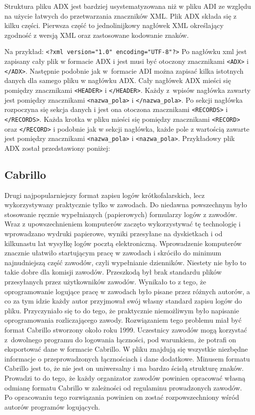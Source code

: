 \documentclass[]{mgr}
\begin{document}
            Struktura pliku ADX jest bardziej usystematyzowana niż w pliku ADI ze względu na użycie łatwych do przetwarzania znaczników XML. Plik ADX składa się z kilku części. Pierwsza część to jednolinijkowy nagłówek XML określający zgodność z wersją XML oraz zastosowane kodowanie znaków.

            \noindent Na przykład: \texttt{<?xml version="1.0" encoding="UTF-8"?>}
            Po nagłówku xml jest zapisany cały plik w formacie ADX i jest musi być otoczony znacznikami \texttt{<ADX>} i \texttt{</ADX>}. Następnie podobnie jak w~formacie ADI można zapisać kilka istotnych danych dla samego pliku w nagłówku ADX. Cały nagłówek ADX mieści się pomiędzy znacznikami \texttt{<HEADER>} i \texttt{</HEADER>}. Każdy z~wpisów nagłówka zawarty jest pomiędzy znacznikami \texttt{<nazwa\_pola>} i \texttt{</nazwa\_pola>}. Po sekcji nagłówka rozpoczyna się sekcja danych i jest ona otoczona znacznikami \texttt{<RECORDS>} i \texttt{</RECORDS>}. Każda krotka w pliku mieści się pomiędzy znacznikami \texttt{<RECORD>} oraz \texttt{</RECORD>} i podobnie jak w sekcji nagłówka, każde pole z wartością zawarte jest pomiędzy znacznikami \texttt{<nazwa\_pola>} i \texttt{<nazwa\_pola>}. Przykładowy plik ADX został przedstawiony poniżej:

            

            \subsection{Cabrillo}
            Drugi najpopularniejszy format zapisu logów krótkofalarskich, lecz wykorzystywany praktycznie tylko w zawodach. Do niedawna powszechnym było stosowanie ręcznie wypełnianych (papierowych) formularzy logów z zawodów. Wraz z upowszechnieniem komputerów zaczęto wykorzystywać tę technologię i wprowadzano wydruki papierowe, wyniki przesyłane na dyskietkach i od kilkunastu lat wysyłkę logów pocztą elektroniczną. Wprowadzenie komputerów znacznie ułatwiło startującym pracę w zawodach i skróciło do minimum najnudniejszą część zawodów, czyli wypełnianie dzienników. Niestety nie było to takie dobre dla komisji zawodów. Przeszkodą był brak standardu plików przesyłanych przez użytkowników zawodów. Wynikało to z tego, że oprogramowanie logujące pracę w zawodach było pisane przez różnych autorów, a co za tym idzie każdy autor przyjmował swój własny standard zapisu logów do pliku. Przyczyniało się to do tego, że praktycznie niemożliwym było napisanie oprogramowania rozliczającego zawody. Rozwiązaniem tego problemu miał być format Cabrillo stworzony około roku 1999. Uczestnicy zawodów mogą korzystać z~dowolnego programu do logowania łączności, pod warunkiem, że potrafi on eksportować dane w formacie Cabrillo. W pliku znajdują się wszystkie niezbędne informacje o przeprowadzonych łącznościach i dane dodatkowe. Minusem formatu Cabrillo jest to, że nie jest on uniwersalny i ma bardzo ścisłą strukturę znaków. Prowadzi to do tego, że każdy organizator zawodów powinien opracować własną odmianę formatu Cabrillo w zależności od regulaminu prowadzonych zawodów. Po opracowaniu tego rozwiązania powinien on zostać rozpowszechniony wśród autorów programów logujących.
\end{document}
